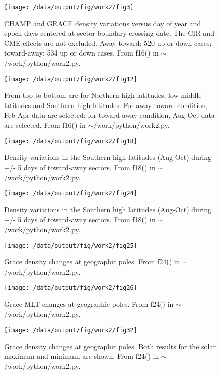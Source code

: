 \documentclass[12pt,a4paper]{article}
\begin{document}
\begin{figure}[!ht]
    \centering
    \texttt{[image: /data/output/fig/work2/fig3]}
    \label{fig6}
    \caption{CHAMP and GRACE density variations versus day of year and epoch days centered at sector boundary crossing date. The CIR and CME effects are not excluded. Away-toward: 520 up or down cases; toward-away: 534 up or down cases. From f16() in $\sim$/work/python/work2.py. }
\end{figure}

\begin{figure}[!ht]
    \centering
    \texttt{[image: /data/output/fig/work2/fig12]}
    \label{fig7}
    \caption{From top to bottom are for Northern high latitudes, low-middle latitudes and Southern high latitudes. For away-toward condition, Feb-Apr data are selected; for toward-away condition, Aug-Oct data are selected. From f16() in $\sim$/work/python/work2.py.}
\end{figure}

\begin{figure}[!ht]
    \centering
    \texttt{[image: /data/output/fig/work2/fig18]}
    \label{fig8}
    \caption{Density variations in the Southern high latitudes (Aug-Oct) during +/- 5 days of toward-away sectors. From f18() in $\sim$/work/python/work2.py.}
\end{figure}

\begin{figure}[!ht]
    \centering
    \texttt{[image: /data/output/fig/work2/fig24]}
    \label{fig9}
    \caption{Density variations in the Southern high latitudes (Aug-Oct) during +/- 5 days of toward-away sectors. From f18() in $\sim$/work/python/work2.py.}
\end{figure}

\begin{figure}[!ht]
    \centering
    \texttt{[image: /data/output/fig/work2/fig25]}
    \caption{Grace density changes at geographic poles. From f24() in $\sim$/work/python/work2.py.}
    \label{fig10}
\end{figure}

\begin{figure}[!ht]
    \centering
    \texttt{[image: /data/output/fig/work2/fig26]}
    \label{fig11}
    \caption{Grace MLT changes at geographic poles. From f24() in $\sim$/work/python/work2.py.}
\end{figure}

\begin{figure}[!ht]
    \centering
    \texttt{[image: /data/output/fig/work2/fig32]}
    \label{fig12}
    \caption{Grace density changes at geographic poles. Both results for the solar maximum and minimum are shown. From f24() in $\sim$/work/python/work2.py.}
\end{figure}
\end{document}
